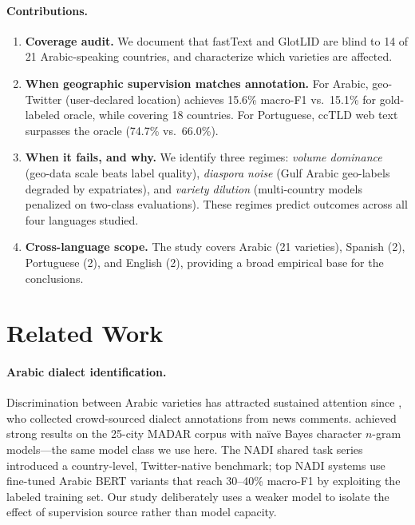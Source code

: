 \documentclass[11pt]{article}
\begin{document}
\paragraph{Contributions.}
\begin{enumerate}
\item \textbf{Coverage audit.}  We document that fastText and GlotLID are
      blind to 14 of 21 Arabic-speaking countries, and characterize which
      varieties are affected.

\item \textbf{When geographic supervision matches annotation.}
      For Arabic, geo-Twitter (user-declared location) achieves 15.6\%
      macro-F1 vs.\ 15.1\% for gold-labeled oracle, while covering 18
      countries.  For Portuguese, ccTLD web text surpasses the oracle
      (74.7\% vs.\ 66.0\%).

\item \textbf{When it fails, and why.}  We identify three regimes:
      \textit{volume dominance} (geo-data scale beats label quality),
      \textit{diaspora noise} (Gulf Arabic geo-labels degraded by expatriates),
      and \textit{variety dilution} (multi-country models penalized on
      two-class evaluations).  These regimes predict outcomes across all
      four languages studied.

\item \textbf{Cross-language scope.}  The study covers Arabic (21 varieties),
      Spanish (2), Portuguese (2), and English (2), providing a broad
      empirical base for the conclusions.
\end{enumerate}

\section{Related Work}
\label{sec:related}

\paragraph{Arabic dialect identification.}
Discrimination between Arabic varieties has attracted sustained attention since
\citet{zaidan-callison-burch-2014-arabic}, who collected crowd-sourced dialect
annotations from news comments.
\citet{salameh-etal-2018-fine} achieved strong results on the 25-city MADAR
corpus with na\"ive Bayes character $n$-gram models---the same model class we
use here.  The NADI shared task series \cite{abdul-mageed-etal-2020-nadi}
introduced a country-level, Twitter-native benchmark; top NADI systems use
fine-tuned Arabic BERT variants that reach 30--40\% macro-F1 by exploiting
the labeled training set.  Our study deliberately uses a weaker model to
isolate the effect of supervision source rather than model capacity.
\end{document}
